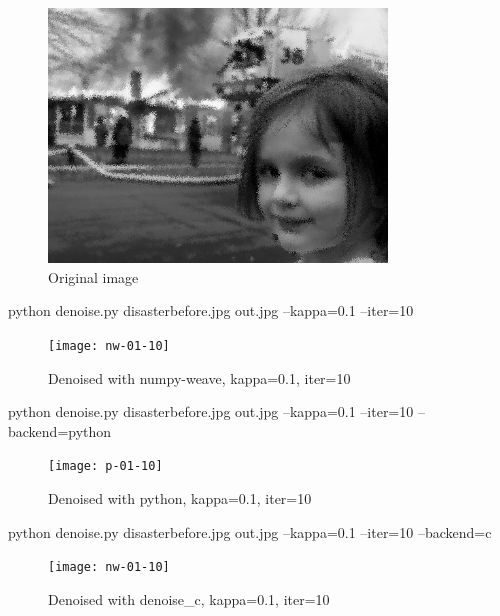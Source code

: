\begin{figure}[!h]
\centering
\includegraphics[width=90mm]{disasterbefore}
\caption{Original image \label{original}}
\end{figure}

\pagebreak

python denoise.py disasterbefore.jpg out.jpg --kappa=0.1 --iter=10

\begin{figure}[!h]
\centering
\texttt{[image: nw-01-10]}
\caption{Denoised with numpy-weave, kappa=0.1, iter=10 \label{nw-mono}}
\end{figure}

\pagebreak

python denoise.py disasterbefore.jpg out.jpg --kappa=0.1 --iter=10 --backend=python

\begin{figure}[!h]
\centering
\texttt{[image: p-01-10]}
\caption{Denoised with python, kappa=0.1, iter=10 \label{p-mono}}
\end{figure}

\pagebreak

python denoise.py disasterbefore.jpg out.jpg --kappa=0.1 --iter=10 --backend=c

\begin{figure}[!h]
\centering
\texttt{[image: nw-01-10]}
\caption{Denoised with denoise\_c, kappa=0.1, iter=10 \label{c-mono}}
\end{figure}

\pagebreak